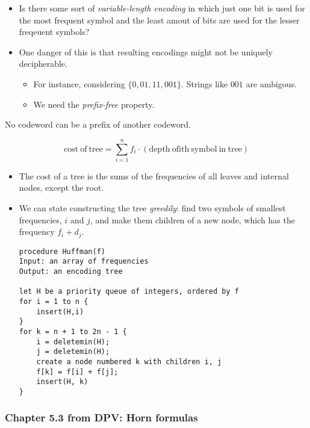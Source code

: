 \documentclass[a4paper,11pt]{article}
\begin{document}
\begin{itemize}
\itemsep1pt\parskip0pt
\item
  Is there some sort of \emph{variable-length encoding} in which just
  one bit is used for the most frequent symbol and the least amout of
  bits are used for the lesser freqeuent symbols?
\item
  One danger of this is that resulting encodings might not be uniquely
  decipherable.

  \begin{itemize}
  \itemsep1pt\parskip0pt
  \item
    For instance, considering $\lbrace 0, 01, 11, 001 \rbrace$. Strings
    like $001$ are ambigous.
  \item
    We need the \emph{prefix-free} property.
  \end{itemize}
\end{itemize}

\begin{description}
\itemsep1pt\parskip0pt
\item[Prefix free]
No codeword can be a prefix of another codeword.
\end{description}

\[\mathrm{cost \: of \: tree} = \sum_{i=1}^n f_i \cdot (\mathrm{depth \: of ith \: symbol \: in \: tree})\]

\begin{itemize}
\item
  The cost of a tree is the sums of the frequencies of all leaves and
  internal nodes, except the root.
\item
  We can state constructing the tree \emph{greedily}: find two symbols
  of smallest frequencies, $i$ and $j$, and make them children of a new
  node, which has the frequency $f_i + d_j$.

\begin{verbatim}
procedure Huffman(f)
Input: an array of frequencies
Output: an encoding tree

let H be a priority queue of integers, ordered by f 
for i = 1 to n {
    insert(H,i)
}
for k = n + 1 to 2n - 1 {
    i = deletemin(H); 
    j = deletemin(H);
    create a node numbered k with children i, j
    f[k] = f[i] + f[j]; 
    insert(H, k)
}
\end{verbatim}
\end{itemize}

\subsubsection{Chapter 5.3 from DPV: Horn
formulas}\label{chapter-5.3-from-dpv-horn-formulas}
\end{document}
